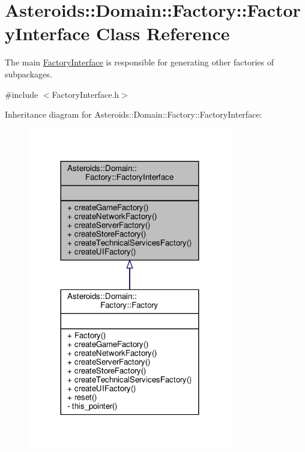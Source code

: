 \hypertarget{classAsteroids_1_1Domain_1_1Factory_1_1FactoryInterface}{}\section{Asteroids\+:\+:Domain\+:\+:Factory\+:\+:Factory\+Interface Class Reference}
\label{classAsteroids_1_1Domain_1_1Factory_1_1FactoryInterface}


The main \hyperlink{classAsteroids_1_1Domain_1_1Factory_1_1FactoryInterface}{Factory\+Interface} is responsible for generating other factories of subpackages.  




{\ttfamily \#include $<$Factory\+Interface.\+h$>$}



Inheritance diagram for Asteroids\+:\+:Domain\+:\+:Factory\+:\+:Factory\+Interface\+:\nopagebreak
\begin{figure}[H]
\begin{center}
\leavevmode
\includegraphics[width=252pt]{classAsteroids_1_1Domain_1_1Factory_1_1FactoryInterface__inherit__graph}
\end{center}
\end{figure}


